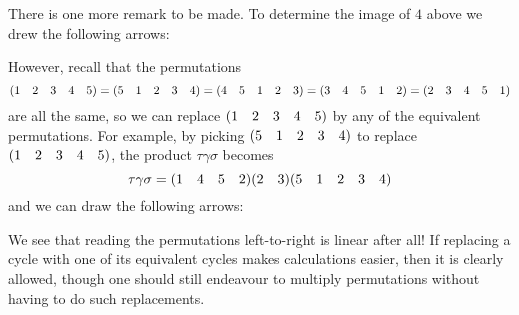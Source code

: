 There is one more remark to be made. To determine the image of $4$ above we drew the following arrows:

\begin{figure}[ht]
    \centering
\end{figure}

However, recall that the permutations
\[
(1 \quad 2 \quad 3 \quad 4 \quad 5) = (5 \quad 1 \quad 2 \quad 3 \quad 4) = (4 \quad 5 \quad 1 \quad 2 \quad 3) = (3 \quad 4 \quad 5 \quad 1 \quad 2) = (2 \quad 3 \quad 4 \quad 5  \quad 1)
\]
are all the same, so we can replace $(1 \quad 2 \quad 3 \quad 4 \quad 5)$ by any of the equivalent permutations. For example, by picking $(5 \quad 1 \quad 2 \quad 3 \quad 4)$ to replace $(1 \quad 2 \quad 3 \quad 4 \quad 5)$, the product $\tau\gamma\sigma$ becomes
\[
\tau\gamma\sigma = (1 \quad 4 \quad 5 \quad 2)(2 \quad 3)(5 \quad 1 \quad 2 \quad 3 \quad 4)
\]
and we can draw the following arrows:

\begin{figure}[h]
    \centering
\end{figure}

We see that reading the permutations left-to-right is linear after all! If replacing a cycle with one of its equivalent cycles makes calculations easier, then it is clearly allowed, though one should still endeavour to multiply permutations without having to do such replacements.


